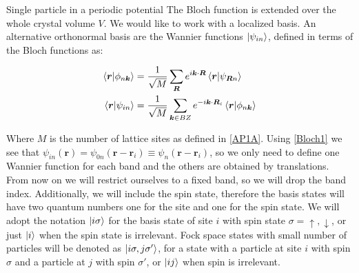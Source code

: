 \begin{section}{Single particle in a periodic potential}
The Bloch function is extended over the whole crystal volume $V$. We would like to work with a localized basis. An alternative orthonormal basis are the Wannier functions $\ket{\psi_{in}}$, defined in terms of the Bloch functions as:

\begin{align}
\bra{\boldsymbol{r}}\ket{\phi_{n\boldsymbol{k}}} &= \frac{1}{\sqrt{M}}\sum_{\boldsymbol{R}} e^{i\boldsymbol{k}\cdot\boldsymbol{R}} \bra{\boldsymbol{r}}\ket{\psi_{\boldsymbol{R}n}}  \label{Wannier1} \\
\bra{\boldsymbol{r}}\ket{\psi_{in}} &= \frac{1}{\sqrt{M}} \sum_{\boldsymbol{k}\in BZ} e^{-i\boldsymbol{k}\cdot\boldsymbol{R}_i} \bra{\boldsymbol{r}}\ket{\phi_{n\boldsymbol{k}}}\label{Wannier2}
\end{align}

Where $M$ is the number of lattice sites as defined in \ref{AP1A}. Using \ref{Bloch1} we see that $\psi_{in}(\textbf{r}) = \psi_{0n}(\textbf{r}-\textbf{r}_i) \equiv \psi_{n}(\textbf{r}-\textbf{r}_i)$, so we only need to define one Wannier function for each band and the others are obtained by translations. From now on we will restrict ourselves to a fixed band, so we will drop the band index. Additionally, we will include the spin state, therefore the basis states will have two quantum numbers one for the site and one for the spin state. We will adopt the notation $\ket{i\sigma}$ for the basis state of site $i$ with spin state $\sigma = \uparrow, \downarrow$, or just $\ket{i}$ when the spin state is irrelevant. Fock space states with small number of particles will be denoted as $\ket{i\sigma, j\sigma'}$, for a state with a particle at site $i$ with spin $\sigma$ and a particle at $j$ with spin $\sigma'$, or $\ket{ij}$ when spin is irrelevant.

\end{section}

